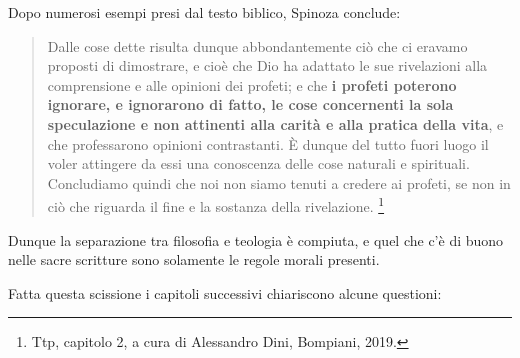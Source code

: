 Dopo numerosi esempi presi dal testo biblico, Spinoza conclude:

\begin{quotation}
	\small Dalle cose dette risulta dunque abbondantemente ciò che ci eravamo proposti di
	dimostrare, e cioè che Dio ha adattato le sue rivelazioni alla comprensione e alle opinioni dei
	profeti; e che \textbf{i profeti poterono ignorare, e ignorarono di fatto, le cose concernenti la sola
	speculazione e non attinenti alla carità e alla pratica della vita}, e che professarono opinioni
	contrastanti. È dunque del tutto fuori luogo il voler attingere da essi una conoscenza delle cose
	naturali e spirituali. Concludiamo quindi che noi non siamo tenuti a credere ai profeti, se non in ciò
	che riguarda il fine e la sostanza della rivelazione. \footnote{Ttp, capitolo 2, a cura di Alessandro Dini, Bompiani, 2019.}
\end{quotation}

Dunque la separazione tra filosofia e teologia è compiuta, e quel che c'è di buono nelle sacre scritture sono solamente le regole morali presenti.

Fatta questa scissione i capitoli successivi chiariscono alcune questioni:


